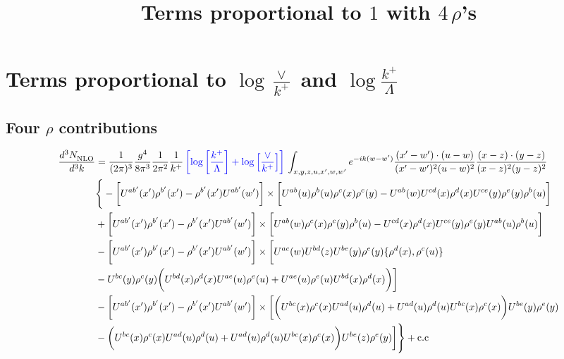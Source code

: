 \documentclass[aps,prd,amsmath,amssymb,nofootinbib]{revtex4-2}
\title{Terms proportional to $1$ with $4\, \rho$'s}
\numberwithin{equation}{section}
\begin{document}
\section{Terms proportional to $\log{\frac{\vee}{k^{+}}}$ and $\log{\frac{k^{+}}{\Lambda}}$}
\subsection{Four $\rho$ contributions}
\begin{align} \label{eq:4rho}
    \frac{d^{3}N_{\rm NLO}^{\rm}}{d^{3}k}  & = \frac{1}{(2\pi)^{3}}\frac{g^{4}}{8\pi^{3}}\frac{1}{2\pi^{2}} \frac{1}{k^{+}}\,{\color{blue}\left[\log{\left[\frac{k^{+}}{\Lambda}\right]}+\log{\left[\frac{\vee}{k^{+}}\right]}\right]}\,\int_{x,y,z,u,x^{\prime},w,w^{\prime}}e^{-ik(w-w^{\prime})}\frac{(x^{\prime}-w^{\prime})\cdot (u-w)}{(x^{\prime}-w^{\prime})^{2} (u-w)^{2}} \frac{(x-z)\cdot (y-z)}{(x-z)^{2}(y-z)^{2}}\notag \\ & \Bigg\{-\bigg[U^{ab^{\prime}}(x^{\prime})\rho^{b^{\prime}}(x^{\prime})-\rho^{b^{\prime}}(x^{\prime})U^{ab^{\prime}}(w^{\prime})\bigg]\times\bigg[U^{ab}(u)\rho^{b}(u)\rho^{c}(x)\rho^{c}(y)-U^{ab}(w)U^{cd}(x)\rho^{d}(x)U^{ce}(y)\rho^{e}(y)\rho^{b}(u)\bigg]\notag \\ & + \bigg[U^{ab^{\prime}}(x^{\prime})\rho^{b^{\prime}}(x^{\prime})-\rho^{b^{\prime}}(x^{\prime})U^{ab^{\prime}}(w^{\prime})\bigg]\times \bigg[U^{ab}(w)\rho^{c}(x)\rho^{c}(y)\rho^{b}(u)-U^{cd}(x)\rho^{d}(x)U^{ce}(y)\rho^{e}(y)U^{ab}(u)\rho^{b}(u)\bigg]\notag \\ & 
    -\bigg[U^{ab^{\prime}}(x^{\prime})\rho^{b^{\prime}}(x^{\prime})-\rho^{b^{\prime}}(x^{\prime})U^{ab^{\prime}}(w^{\prime})\bigg]\times \bigg[U^{ac}(w)U^{bd}(z)U^{be}(y)\rho^{e}(y)\{\rho^{d}(x),\rho^{c}(u)\}\notag \\ &-U^{bc}(y)\rho^{c}(y)\bigg(U^{bd}(x)\rho^{d}(x) U^{ae}(u)\rho^{e}(u)+U^{ae}(u)\rho^{e}(u)U^{bd}(x)\rho^{d}(x)\bigg)\bigg]\notag \\ & - \bigg[U^{ab^{\prime}}(x^{\prime})\rho^{b^{\prime}}(x^{\prime})-\rho^{b^{\prime}}(x^{\prime})U^{ab^{\prime}}(w^{\prime})\bigg]\times \bigg[\bigg(U^{bc}(x)\rho^{c}(x)U^{ad}(u)\rho^{d}(u)+U^{ad}(u)\rho^{d}(u)U^{bc}(x)\rho^{c}(x)\bigg)U^{be}(y)\rho^{e}(y)\notag \\ & -\bigg(U^{bc}(x)\rho^{c}(x)U^{ad}(u)\rho^{d}(u)+U^{ad}(u)\rho^{d}(u)U^{bc}(x)\rho^{c}(x)\bigg)U^{be}(z)\rho^{e}(y)\bigg]\Bigg\}+\rm{c.c} \notag \\ & 

\end{align}
\end{document}
